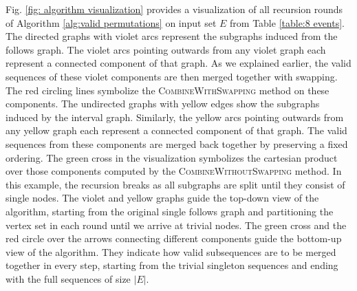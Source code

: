 Fig. \ref{fig: algorithm visualization} provides a visualization of all recursion rounds of Algorithm \ref{alg:valid permutations} on input set $E$ from Table \ref{table:8 events}.
The directed graphs with violet arcs represent the subgraphs induced from the follows graph.
The violet arcs pointing outwards from any violet graph each represent a connected component of that graph.
As we explained earlier, the valid sequences of these violet components are then merged together with swapping.
The red circling lines symbolize the \textsc{CombineWithSwapping} method on these components.
The undirected graphs with yellow edges show the subgraphs induced by the interval graph.
Similarly, the yellow arcs pointing outwards from any yellow graph each represent a connected component of that graph.
The valid sequences from these components are merged back together by preserving a fixed ordering.
The green cross in the visualization symbolizes the cartesian product over those components computed by the \textsc{CombineWithoutSwapping} method.
In this example, the recursion breaks as all subgraphs are split until they consist of single nodes.
The violet and yellow graphs guide the top-down view of the algorithm, starting from the original single follows graph and partitioning the vertex set in each round until we arrive at trivial nodes.
The green cross and the red circle over the arrows connecting different components guide the bottom-up view of the algorithm.
They indicate how valid subsequences are to be merged together in every step, starting from the trivial singleton sequences and ending with the full sequences of size $|E|$.
%
%
%
%
%
%
